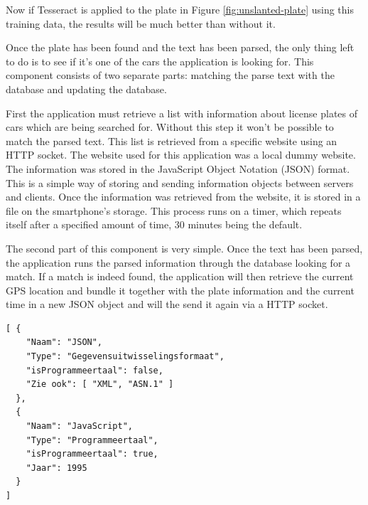 Now if Tesseract is applied to the plate in Figure \ref{fig:unslanted-plate} using this training data, the results will be much better than without it.


Once the plate has been found and the text has been parsed, the only thing left to do is to see if it's one of the cars the application is looking for. This component consists of two separate parts: matching the parse text with the database and updating the database.

First the application must retrieve a list with information about license plates of cars which are being searched for. Without this step it won't be possible to match the parsed text. This list is retrieved from a specific website using an HTTP socket. The website used for this application was a local dummy website. The information was stored in the JavaScript Object Notation (JSON) format. This is a simple way of storing and sending information objects between servers and clients. Once the information was retrieved from the website, it is stored in a file on the smartphone's storage. This process runs on a timer, which repeats itself after a specified amount of time, 30 minutes being the default.

The second part of this component is very simple. Once the text has been parsed, the application runs the parsed information through the database looking for a match. If a match is indeed found, the application will then retrieve the current GPS location and bundle it together with the plate information and the current time in a new JSON object and will the send it again via a HTTP socket.

\begin{lstlisting}
[ { 
    "Naam": "JSON",
    "Type": "Gegevensuitwisselingsformaat",
    "isProgrammeertaal": false,
    "Zie ook": [ "XML", "ASN.1" ] 
  },
  { 
    "Naam": "JavaScript",
    "Type": "Programmeertaal",
    "isProgrammeertaal": true,
    "Jaar": 1995 
  } 
]
\end{lstlisting}



